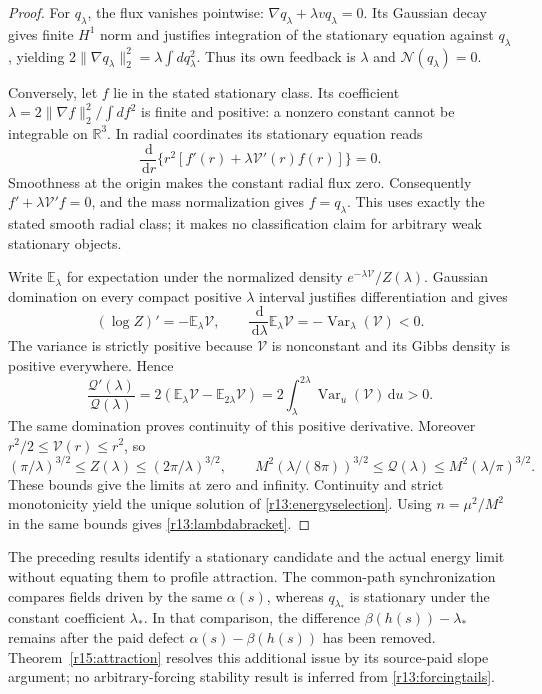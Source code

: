 \documentclass[11pt]{article}
\numberwithin{equation}{section}
\newcommand{\dd}{\,\mathrm d}
\newcommand{\R}{\mathbb R}
\begin{document}
\begin{proof}
For $q_\lambda$, the flux vanishes pointwise:
$\nabla q_\lambda+\lambda vq_\lambda=0$. Its Gaussian decay gives finite
$H^1$ norm and justifies integration of the stationary equation against
$q_\lambda$, yielding
$2\|\nabla q_\lambda\|_2^2=\lambda\int dq_\lambda^2$.
Thus its own feedback is $\lambda$ and $\mathcal N(q_\lambda)=0$.

Conversely, let $f$ lie in the stated stationary class. Its coefficient
$\lambda=2\|\nabla f\|_2^2/\int df^2$ is finite and positive: a nonzero
constant cannot be integrable on $\R^3$. In radial coordinates its
stationary equation reads
\[
 \frac{\dd}{\dd r}\{r^2[f'(r)+\lambda\mathcal V'(r)f(r)]\}=0.
\]
Smoothness at the origin makes the constant radial flux zero.
Consequently $f'+\lambda\mathcal V'f=0$, and the mass normalization
gives $f=q_\lambda$. This uses exactly the stated smooth radial class;
it makes no classification claim for arbitrary weak stationary objects.

Write $\mathbb E_\lambda$ for expectation under the normalized density
$e^{-\lambda\mathcal V}/Z(\lambda)$. Gaussian domination on every compact
positive $\lambda$ interval justifies differentiation and gives
\[
 (\log Z)'=-\mathbb E_\lambda\mathcal V,
 \qquad
 \frac{\dd}{\dd\lambda}\mathbb E_\lambda\mathcal V
                       =-\operatorname{Var}_\lambda(\mathcal V)<0.
\]
The variance is strictly positive because $\mathcal V$ is nonconstant
and its Gibbs density is positive everywhere. Hence
\begin{equation}\label{r13:gibbsmonotonicity}
 \frac{\mathcal Q'(\lambda)}{\mathcal Q(\lambda)}
 =2(\mathbb E_\lambda\mathcal V-\mathbb E_{2\lambda}\mathcal V)
 =2\int_\lambda^{2\lambda}\operatorname{Var}_u(\mathcal V)\dd u>0.
\end{equation}
The same domination proves continuity of this positive derivative.
Moreover $r^2/2\le\mathcal V(r)\le r^2$, so
\[
 (\pi/\lambda)^{3/2}\le Z(\lambda)\le(2\pi/\lambda)^{3/2},
 \qquad
 M^2(\lambda/(8\pi))^{3/2}\le\mathcal Q(\lambda)
                              \le M^2(\lambda/\pi)^{3/2}.
\]
These bounds give the limits at zero and infinity. Continuity and strict
monotonicity yield the unique solution of \eqref{r13:energyselection}.
Using $n=\mu^2/M^2$ in the same bounds gives
\eqref{r13:lambdabracket}.
\end{proof}

The preceding results identify a stationary candidate and the actual
energy limit without equating them to profile attraction. The
common-path synchronization compares fields driven by the same
$\alpha(s)$, whereas $q_{\lambda_*}$ is stationary under the constant
coefficient $\lambda_*$. In that comparison, the difference
$\beta(h(s))-\lambda_*$ remains after the paid defect
$\alpha(s)-\beta(h(s))$ has been removed. Theorem~\ref{r15:attraction}
resolves this additional issue by its source-paid slope argument; no
arbitrary-forcing stability result is inferred from
\eqref{r13:forcingtails}.
\end{document}
